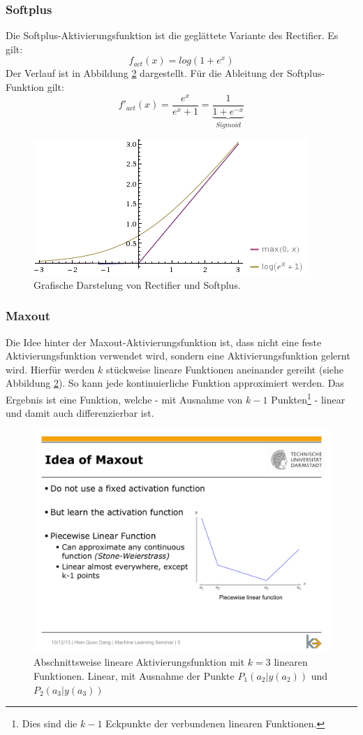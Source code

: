 \subsubsection*{Softplus}
Die Softplus-Aktivierungsfunktion ist die geglättete Variante des Rectifier. Es gilt:
\[
	f_{act}(x) = log(1 + e^x)
\]
Der Verlauf ist in Abbildung \ref{fig:ch01_fact-softplus} dargestellt. Für die Ableitung der Softplus-Funktion gilt:
\[
	f'_{act}(x) = \frac{e^x}{e^x + 1} = 
		\underbrace{\frac{1}{1 + e^{-x}}}_{Sigmoid}
\]

\begin{figure}[ht!] \centering 
	\includegraphics[width=\linewidth]{figures/ch01_fact-softplus.png}
	\caption{Grafische Darstelung von Rectifier und Softplus.}
	\label{fig:ch01_fact-softplus}
\end{figure}

\subsubsection*{Maxout}
Die Idee hinter der Maxout-Aktivierungsfunktion ist, dass nicht eine feste Aktivierungsfunktion verwendet wird, sondern eine Aktivierungsfunktion gelernt wird.
Hierfür werden $k$ stückweise lineare Funktionen aneinander gereiht (siehe Abbildung \ref{fig:ch01_fact-softplus}). So kann jede kontinuierliche Funktion approximiert werden. Das Ergebnis ist eine Funktion, welche - mit Ausnahme von $k-1$ Punkten\footnote{Dies sind die $k-1$ Eckpunkte der verbundenen linearen Funktionen.} - linear und damit auch differenzierbar ist.

\begin{figure}[ht!] \centering 
	\includegraphics[width=0.7\linewidth]{figures/ch01_maxout-paarweise-lineare-fkt.pdf}
	\caption{Abschnittsweise lineare Aktivierungsfunktion mit $k=3$ linearen Funktionen. Linear, mit Ausnahme der Punkte $P_1(a_2|y(a_2))$ und $P_2(a_3|y(a_3))$}
	\label{fig:ch01_fact-softplus}
\end{figure}

